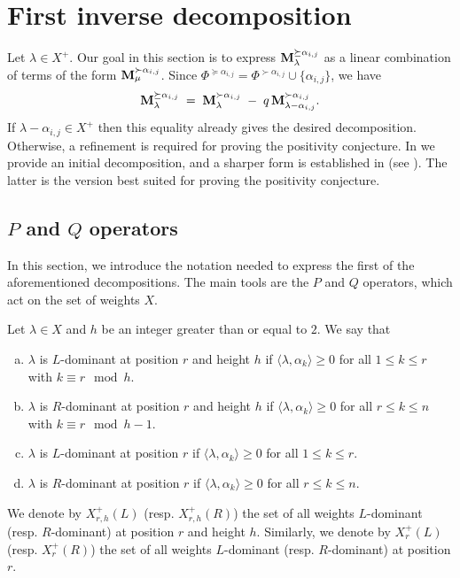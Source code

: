 \section{First inverse decomposition} \label{Section: descomposición inversa}



Let $\lambda\in X^+$. Our goal in this section is to express $\mathbf{M}_{\lambda}^{\succeq \alpha_{i,j}}$ as a linear combination of terms of the form $\mathbf{M}_{\mu}^{\succ \alpha_{i,j}}$. 
Since $\Phi^{\succeq \alpha_{i,j}}=\Phi^{\succ \alpha_{i,j}}\cup\{\alpha_{i,j}\}$, we have
\begin{equation}
   \mathbf{M}_{\lambda}^{\succeq \alpha_{i,j}}
   \;=\;
   \mathbf{M}_{\lambda}^{\succ \alpha_{i,j}}
   \;-\;
   q\,\mathbf{M}_{\lambda-\alpha_{i,j}}^{\succ \alpha_{i,j}}.
\end{equation}
If $\lambda-\alpha_{i,j}\in X^+$ then this equality already gives the desired decomposition. 
Otherwise, a refinement is required for proving the positivity conjecture.
In  we provide an initial decomposition, and a sharper form is established in  (see ). 
The latter is the version best suited for proving the positivity conjecture.




\subsection{$P$ and $Q$ operators}
In this section, we introduce the notation needed to express the first of the aforementioned decompositions. The main tools are the $P$ and $Q$ operators, which act on the set of weights $X$.



\begin{definition}\rm 
Let $\lambda\in X$ and $h $ be an  integer greater than or equal to $2$. 
We say that 
\begin{enumerate}[(a)]
    \item  $\lambda$ is $L$-dominant at position $r$ and height $h$ if $\langle \lambda , \alpha_k \rangle \geq 0$ for all  $1\leq k\leq r$ with $k\equiv r \mod{h}$. 
    \item  $\lambda$ is $R$-dominant at position $r$ and height $h$ if $\langle \lambda , \alpha_k \rangle \geq 0$ for all $r \leq k \leq n$ with $k\equiv r \mod{h-1}$.
    \item $\lambda$ is $L$-dominant at position $r$  if $\langle \lambda , \alpha_k \rangle \geq 0$ for all  $1\leq k\leq r$. 
    \item $\lambda$ is $R$-dominant at position $r$ if $\langle \lambda , \alpha_k \rangle \geq 0$ for all $r \leq k \leq n$.
\end{enumerate}
We denote by $X_{r,h}^+(L) $ (resp. $X_{r,h}^+(R)$) the set of all weights $L$-dominant (resp. $R$-dominant) at position $r$ and height $h$.
Similarly, we denote by $X_{r}^+(L) $ (resp. $X_{r}^+(R)$) the set of all weights $L$-dominant (resp. $R$-dominant) at position $r$.
\end{definition}



